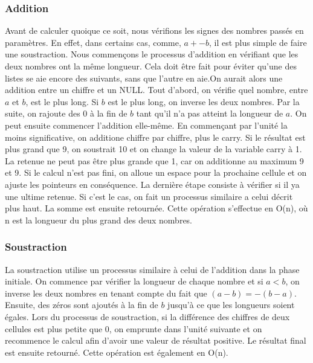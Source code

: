 \documentclass[letterpaper,12pt]{scrartcl}
\begin{document}
            \subsubsection{Addition}
             Avant de calculer quoique ce soit, nous vérifions les signes des nombres passés en paramètres. En effet, dans certains cas, comme, $a + -b$, il est plus simple de faire une soustraction. Nous commençons le processus d'addition en vérifiant que les deux nombres ont la même longueur. Cela doit être fait pour éviter qu'une des listes se aie encore des suivants, sans que l'autre en aie.On aurait alors une addition entre un chiffre et un NULL. Tout d'abord, on vérifie quel nombre, entre $a$ et $b$, est le plus long. Si $b$ est le plus long, on inverse les deux nombres. Par la suite, on rajoute des 0 à la fin de $b$ tant qu'il n'a pas atteint la longueur de $a$. On peut ensuite commencer l'addition elle-même. En commençant par l'unité la moins significative, on additione chiffre par chiffre, plus le carry. Si le résultat est plus grand que 9, on soustrait 10 et on change la valeur de la variable carry à 1. La retenue ne peut pas être plus grande que 1, car on additionne au maximum 9 et 9. Si le calcul n'est pas fini, on alloue un espace pour la prochaine cellule et on ajuste les pointeurs en conséquence. La dernière étape consiste à vérifier si il ya une ultime retenue. Si c'est le cas, on fait un processus similaire a celui décrit plus haut. La somme est ensuite retournée. Cette opération s'effectue en O(n), où n est la longueur du plus grand des deux nombres.
            
            \subsubsection{Soustraction}
             La soustraction utilise un processus similaire à celui de l'addition dans la phase initiale. On commence par vérifier la longueur de chaque nombre et si $a < b$, on inverse les deux nombres en tenant compte du fait que $(a-b) = -(b-a)$. Ensuite, des zéros sont ajoutés à la fin de $b$ jusqu'à ce que les longueurs soient égales. Lors du processus de soustraction, si la différence des chiffres de deux cellules est plus petite que 0, on emprunte dans l'unité suivante et on recommence le calcul afin d'avoir une valeur de résultat positive. Le résultat final est ensuite retourné. Cette opération est également en O(n).
            
\end{document}
